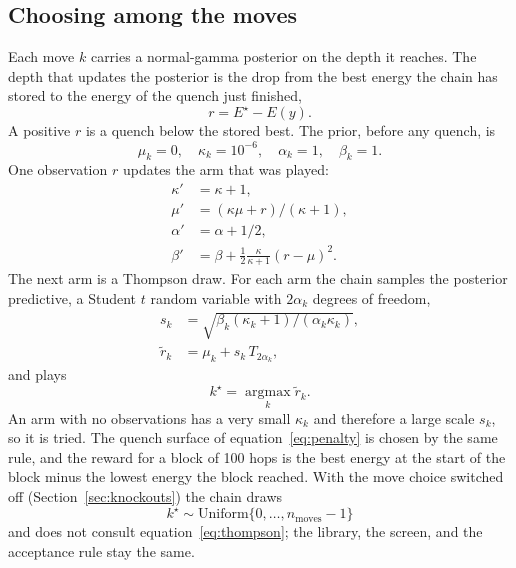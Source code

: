 \documentclass[journal=jctcce,manuscript=article]{achemso}
\begin{document}
\subsection{Choosing among the moves}
\label{sec:posterior}
Each move \(k\) carries a normal-gamma posterior on the depth it reaches.
\cite{thompson1933}
The depth that updates the posterior is the drop from the best energy
the chain has stored to the energy of the quench just finished,
\begin{equation}
r = E^{\star} - E(y).
\label{eq:depth}
\end{equation}
A positive \(r\) is a quench below the stored best.
The prior, before any quench, is
\begin{equation}
\mu_k = 0, \quad \kappa_k = 10^{-6}, \quad \alpha_k = 1, \quad \beta_k = 1.
\label{eq:prior}
\end{equation}
One observation \(r\) updates the arm that was played:
\begin{equation}
\begin{aligned}
\kappa' &= \kappa + 1,\\
\mu' &= (\kappa\mu + r)/(\kappa+1),\\
\alpha' &= \alpha + 1/2,\\
\beta' &= \beta + \tfrac12 \frac{\kappa}{\kappa+1}(r-\mu)^2.
\end{aligned}
\label{eq:update}
\end{equation}
The next arm is a Thompson draw.
For each arm the chain samples the posterior predictive, a Student \(t\)
random variable with \(2\alpha_k\) degrees of freedom,
\begin{equation}
\begin{aligned}
s_k &= \sqrt{\beta_k(\kappa_k+1)/(\alpha_k\kappa_k)},\\
\tilde r_k &= \mu_k + s_k\, T_{2\alpha_k},
\end{aligned}
\label{eq:thompson}
\end{equation}
and plays
\begin{equation}
k^{\star} = \operatorname*{argmax}_k \tilde r_k.
\label{eq:argmax}
\end{equation}
An arm with no observations has a very small \(\kappa_k\) and therefore
a large scale \(s_k\), so it is tried.
The quench surface of equation~\ref{eq:penalty} is chosen by the same rule,
and the reward for a block of 100 hops is the best energy at the start of the
block minus the lowest energy the block reached.
With the move choice switched off (Section~\ref{sec:knockouts}) the chain
draws
\begin{equation}
k^{\star} \sim \mathrm{Uniform}\{0,\ldots,n_{\mathrm{moves}}-1\}
\label{eq:uniform}
\end{equation}
and does not consult equation~\ref{eq:thompson}; the library, the screen, and
the acceptance rule stay the same.
\end{document}
